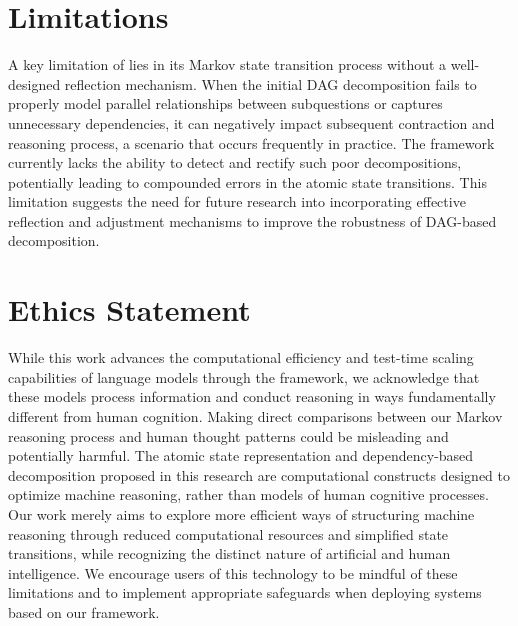 \section{Limitations}
A key limitation of \our lies in its Markov state transition process without a well-designed reflection mechanism. When the initial DAG decomposition fails to properly model parallel relationships between subquestions or captures unnecessary dependencies, it can negatively impact subsequent contraction and reasoning process, a scenario that occurs frequently in practice. The framework currently lacks the ability to detect and rectify such poor decompositions, potentially leading to compounded errors in the atomic state transitions. This limitation suggests the need for future research into incorporating effective reflection and adjustment mechanisms to improve the robustness of DAG-based decomposition.

\section{Ethics Statement}
While this work advances the computational efficiency and test-time scaling capabilities of language models through the \our framework, we acknowledge that these models process information and conduct reasoning in ways fundamentally different from human cognition. Making direct comparisons between our Markov reasoning process and human thought patterns could be misleading and potentially harmful. The atomic state representation and dependency-based decomposition proposed in this research are computational constructs designed to optimize machine reasoning, rather than models of human cognitive processes. Our work merely aims to explore more efficient ways of structuring machine reasoning through reduced computational resources and simplified state transitions, while recognizing the distinct nature of artificial and human intelligence. We encourage users of this technology to be mindful of these limitations and to implement appropriate safeguards when deploying systems based on our framework.